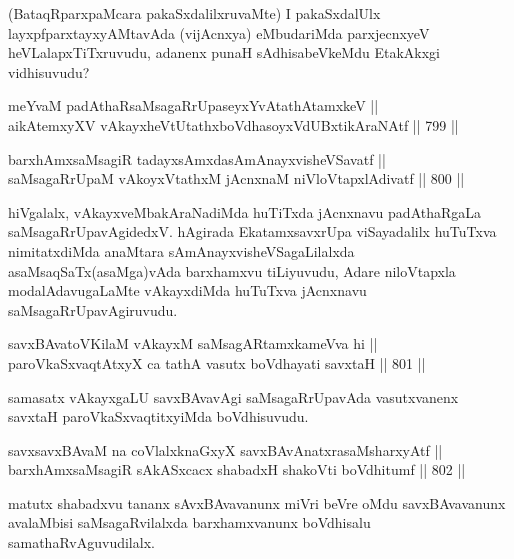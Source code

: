 \begin{artha}
(BataqRparxpaMcara pakaSxdalilxruvaMte) I pakaSxdalUlx layxpfparxtayxyAMtavAda (vijAcnxya) eMbudariMda parxjecnxyeV heVLalapxTiTxruvudu, adanenx punaH sAdhisabeVkeMdu EtakAkxgi vidhisuvudu?
\end{artha}

\begin{shl}
meYvaM padAthaRsaMsagaRrUpaseyxYvAtathAtamxkeV || \\
aikAtemxyXV vAkayxheVtUtathxboVdhasoyxVdUBxtikAraNAtf \hfill || 799 ||  
\end{shl}
				
\begin{shl}
barxhAmxsaMsagiR tadayxsAmxdasAmAnayxvisheVSavatf || \\
saMsagaRrUpaM vAkoyxVtathxM jAcnxnaM niVloVtapxlAdivatf \hfill || 800 ||  
\end{shl}

\begin{artha}
hiVgalalx, vAkayxveMbakAraNadiMda huTiTxda jAcnxnavu padAthaRgaLa saMsagaRrUpavAgidedxV. hAgirada EkatamxsavxrUpa viSayadalilx huTuTxva nimitatxdiMda anaMtara sAmAnayxvisheVSagaLilalxda asaMsaqSaTx(asaMga)vAda barxhamxvu tiLiyuvudu, Adare niloVtapxla modalAdavugaLaMte vAkayxdiMda huTuTxva jAcnxnavu saMsagaRrUpavAgiruvudu.
\end{artha}


\begin{shl}
savxBAvatoV\s KilaM vAkayxM saMsagARtamxkameVva hi || \\
paroVkaSxvaqtAtxyX ca tathA vasutx boVdhayati savxtaH \hfill || 801 ||  
\end{shl}

\begin{artha}
samasatx vAkayxgaLU savxBAvavAgi saMsagaRrUpavAda vasutxvanenx savxtaH paroVkaSxvaqtitxyiMda boVdhisuvudu.
\end{artha}

\begin{shl}
savxsavxBAvaM na coVlalxknaGxyX savxBAvAnatxrasaMsharxyAtf || \\
barxhAmxsaMsagiR sAkASxcacx shabadxH shakoVti boVdhitumf \hfill || 802 ||  
\end{shl}

\begin{artha}
matutx shabadxvu tananx sAvxBAvavanunx miVri beVre oMdu savxBAvavanunx avalaMbisi saMsagaRvilalxda barxhamxvanunx boVdhisalu samathaRvAguvudilalx.
\end{artha}

